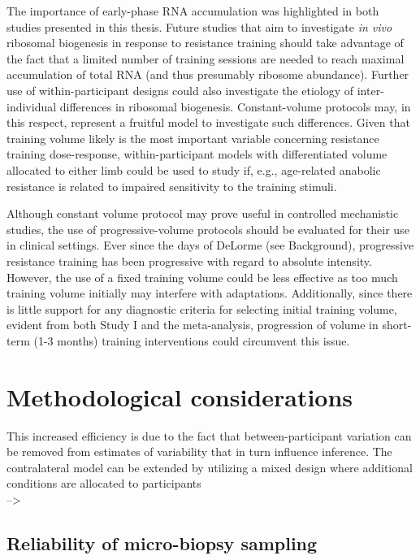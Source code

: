 \documentclass[twoside,10pt]{gihclass} %
\begin{document}
The importance of early-phase RNA accumulation was highlighted in both studies presented in this thesis. Future studies that aim to investigate \emph{in vivo} ribosomal biogenesis in response to resistance training should take advantage of the fact that a limited number of training sessions are needed to reach maximal accumulation of total RNA (and thus presumably ribosome abundance). Further use of within-participant designs could also investigate the etiology of inter-individual differences in ribosomal biogenesis. Constant-volume protocols may, in this respect, represent a fruitful model to investigate such differences. Given that training volume likely is the most important variable concerning resistance training dose-response, within-participant models with differentiated volume allocated to either limb could be used to study if, e.g., age-related anabolic resistance is related to impaired sensitivity to the training stimuli.

Although constant volume protocol may prove useful in controlled mechanistic studies, the use of progressive-volume protocols should be evaluated for their use in clinical settings. Ever since the days of DeLorme (see Background), progressive resistance training has been progressive with regard to absolute intensity. However, the use of a fixed training volume could be less effective as too much training volume initially may interfere with adaptations. Additionally, since there is little support for any diagnostic criteria for selecting initial training volume, evident from both Study I and the meta-analysis, progression of volume in short-term (1-3 months) training interventions could circumvent this issue.

\hypertarget{methodological-considerations}{%
\chapter{Methodological considerations}\label{methodological-considerations}}

This increased efficiency is due to the fact that between-participant variation can be removed from estimates of variability that in turn influence inference.
The contralateral model can be extended by utilizing a mixed design where additional conditions are allocated to participants\\
--\textgreater{}

\hypertarget{reliability-of-micro-biopsy-sampling}{%
\section{Reliability of micro-biopsy sampling}\label{reliability-of-micro-biopsy-sampling}}
\end{document}
